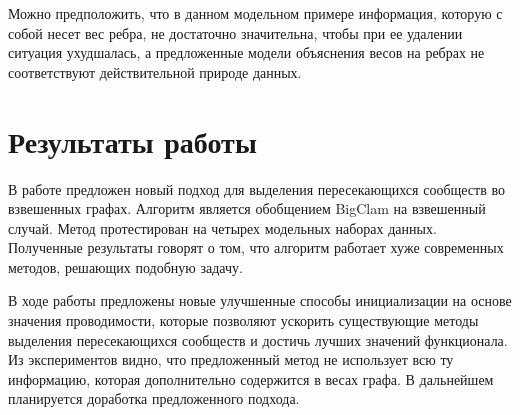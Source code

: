 \documentclass{ITaSconf}
\begin{document}
	Можно предположить, что в данном модельном примере информация, которую с собой несет вес ребра, не достаточно значительна, чтобы при ее удалении ситуация ухудшалась, а предложенные модели объяснения весов на ребрах не соответствуют действительной природе данных.
	
	\section{Результаты работы}
	
	В работе предложен новый подход для выделения пересекающихся сообществ во взвешенных графах.
	Алгоритм является обобщением BigClam на взвешенный случай.
	Метод протестирован на четырех модельных наборах данных.
	Полученные результаты говорят о том, что алгоритм работает хуже современных методов, решающих подобную задачу.
	
	В ходе работы предложены новые улучшенные способы инициализации на основе значения проводимости, которые позволяют ускорить существующие методы выделения пересекающихся сообществ и достичь лучших значений функционала.
	Из экспериментов видно, что предложенный метод не использует всю ту информацию, которая дополнительно содержится в весах графа.
	В дальнейшем планируется доработка предложенного подхода.
	
	
	
	
\end{document}
